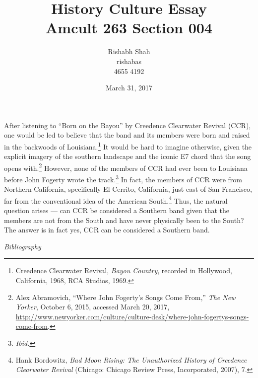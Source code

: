 \documentclass[10pt]{article}
\begin{document}
\title{
	History Culture Essay\\
	Amcult 263 Section 004
	}

\author{
	Rishabh Shah\\
	rishabas\\
	4655 4192\\}

\date{March 31, 2017}

\maketitle
\thispagestyle{empty}

\newpage
\clearpage
{}
\doublespacing

After listening to ``Born on the Bayou'' by Creedence Clearwater Revival (CCR), one would be led to believe that the band and its members were born and raised in the backwoods of Louisiana.\footnote{Creedence Clearwater Revival, \textit{Bayou Country}, recorded in Hollywood, California, 1968, RCA Studios, 1969.} It would be hard to imagine otherwise, given the explicit imagery of the southern landscape and the iconic E7 chord that the song opens with.\footnote{Alex Abramovich, ``Where John Fogerty's Songs Come From,'' \textit{The New Yorker}, October 6, 2015, accessed March 20, 2017, \url{http://www.newyorker.com/culture/culture-desk/where-john-fogertys-songs-come-from}.} However, none of the members of CCR had ever been to Louisiana before John Fogerty wrote the track.\footnote{\textit{Ibid.}} In fact, the members of CCR were from Northern California, specifically El Cerrito, California, just east of San Francisco, far from the conventional idea of the American South.\footnote{Hank Bordowitz, \textit{Bad Moon Rising: The Unauthorized History of Creedence Clearwater Revival} (Chicago: Chicago Review Press, Incorporated, 2007), 7.} Thus, the natural question arises --- can CCR be considered a Southern band given that the members are not from the South and have never physically been to the South? The answer is in fact yes, CCR can be considered a Southern band.

\newpage
\begin{center}
\textit{Bibliography}
\end{center}
\end{document}

